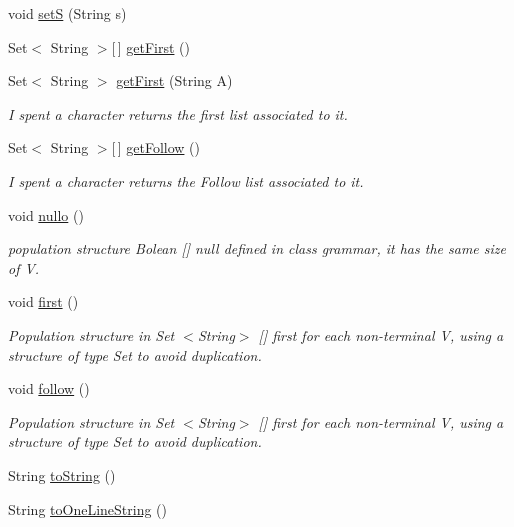 \begin{DoxyCompactItemize}
void \hyperlink{classcontext_free_1_1grammar_1_1_context_free_grammar_a2f4c3ec7270d799ed127cb162e0213b3}{set\-S} (String s)
\item 
Set$<$ String $>$\mbox{[}$\,$\mbox{]} \hyperlink{classcontext_free_1_1grammar_1_1_context_free_grammar_adc3a25917132474960be34329cdaead9}{get\-First} ()
\item 
Set$<$ String $>$ \hyperlink{classcontext_free_1_1grammar_1_1_context_free_grammar_a2140cdc636585e9714e8dc42c936eee5}{get\-First} (String A)
\begin{DoxyCompactList}\small\item\em I spent a character returns the first list associated to it. \end{DoxyCompactList}\item 
Set$<$ String $>$\mbox{[}$\,$\mbox{]} \hyperlink{classcontext_free_1_1grammar_1_1_context_free_grammar_a5dae0e5de95349d310869fb5941cb5be}{get\-Follow} ()
\begin{DoxyCompactList}\small\item\em I spent a character returns the Follow list associated to it. \end{DoxyCompactList}\item 
void \hyperlink{classcontext_free_1_1grammar_1_1_context_free_grammar_ac880ed3ca36ddcd8e20d8279af08244d}{nullo} ()
\begin{DoxyCompactList}\small\item\em population structure Bolean \mbox{[}\mbox{]} null defined in class grammar, it has the same size of V. \end{DoxyCompactList}\item 
void \hyperlink{classcontext_free_1_1grammar_1_1_context_free_grammar_a9c3bfe0b038204420b470fab326ce7bb}{first} ()
\begin{DoxyCompactList}\small\item\em Population structure in Set $<$\-String$>$ \mbox{[}\mbox{]} first for each non-\/terminal V, using a structure of type Set to avoid duplication. \end{DoxyCompactList}\item 
void \hyperlink{classcontext_free_1_1grammar_1_1_context_free_grammar_aca5cad8fa908f908d38e0e7e0aa181ed}{follow} ()
\begin{DoxyCompactList}\small\item\em Population structure in Set $<$\-String$>$ \mbox{[}\mbox{]} first for each non-\/terminal V, using a structure of type Set to avoid duplication. \end{DoxyCompactList}\item 
String \hyperlink{classcontext_free_1_1grammar_1_1_context_free_grammar_afd242bd888b53c20465c0bd3675d29d4}{to\-String} ()
\item 
String \hyperlink{classcontext_free_1_1grammar_1_1_context_free_grammar_a922203e2db862d2a8ab31e8e7736273b}{to\-One\-Line\-String} ()
\end{DoxyCompactItemize}
